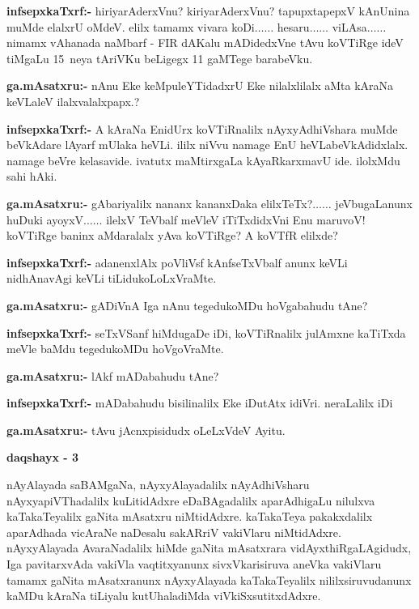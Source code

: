 \smallskip
\noindent
\textbf{infsepxkaTxrf:-} hiriyarAderxVnu? kiriyarAderxVnu? tapupxtapepxV kAnUnina muMde elalxrU oMdeV. elilx tamamx vivara koDi$\ldots\ldots$ hesaru$\ldots\ldots$ viLAsa$\ldots\ldots$ nimamx vAhanada naMbarf - {\rm FIR} dAKalu mADidedxVne tAvu koVTiRge ideV tiMgaLu {\rm 15}~neya tAriVKu beLigegx {\rm 11} gaMTege barabeVku.

\smallskip
\noindent
\textbf{ga.mAsatxru:-} nAnu Eke keMpuleYTidadxrU Eke nilalxlilalx aMta kAraNa keVLaleV ilalxvalalxpapx.?

\smallskip
\noindent
\textbf{infsepxkaTxrf:-} A kAraNa EnidUrx koVTiRnalilx nAyxyAdhiVshara muMde beVkAdare lAyarf mUlaka heVLi. ililx niVvu namage EnU heVLabeVkAdidxlalx. namage beVre kelasavide. ivatutx maMtirxgaLa kAyaRkarxmavU ide. ilolxMdu sahi hAki.

\smallskip
\noindent
\textbf{ga.mAsatxru:-} gAbariyalilx nananx kananxDaka elilxTeTx?$\ldots\ldots$ jeVbugaLanunx huDuki ayoyxV$\ldots\ldots$ ilelxV TeVbalf meVleV iTiTxdidxVni Enu maruvoV! koVTiRge baninx aMdaralalx yAva koVTiRge? A koVTfR elilxde?

\smallskip
\noindent
\textbf{infsepxkaTxrf:-} adanenxlAlx poVliVsf kAnfseTxVbalf anunx keVLi nidhAnavAgi keVLi tiLidukoLoLxVraMte.

\smallskip
\noindent
\textbf{ga.mAsatxru:-} gADiVnA Iga nAnu tegedukoMDu hoVgabahudu tAne?

\smallskip
\noindent
\textbf{infsepxkaTxrf:-} seTxVSanf hiMdugaDe iDi, koVTiRnalilx julAmxne kaTiTxda meVle baMdu tegedukoMDu hoVgoVraMte.

\smallskip
\noindent
\textbf{ga.mAsatxru:-} lAkf mADabahudu tAne?

\smallskip
\noindent
\textbf{infsepxkaTxrf:-} mADabahudu bisilinalilx Eke iDutAtx idiVri. neraLalilx iDi 

\smallskip
\noindent
\textbf{ga.mAsatxru:-} tAvu jAcnxpisidudx oLeLxVdeV Ayitu.

\begin{center}
{\bf  daqshayx - {\rm 3}}
\end{center}

nAyAlayada saBAMgaNa, nAyxyAlayadalilx nAyAdhiVsharu nAyxyapiVThadalilx kuLitidAdxre eDaBAgadalilx aparAdhigaLu nilulxva kaTakaTeyalilx gaNita mAsatxru niMtidAdxre. kaTakaTeya pakakxdalilx aparAdhada vicAraNe naDesalu sakARriV vakiVlaru niMtidAdxre. nAyxyAlayada AvaraNadalilx hiMde gaNita mAsatxrara vidAyxthiRgaLAgidudx, Iga pavitarxvAda vakiVla vaqtitxyanunx sivxVkarisiruva aneVka vakiVlaru tamamx gaNita mAsatxranunx nAyxyAlayada kaTakaTeyalilx nililxsiruvudanunx kaMDu kAraNa tiLiyalu kutUhaladiMda viVkiSxsutitxdAdxre.

